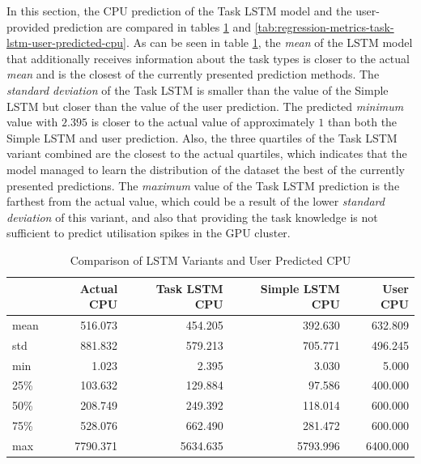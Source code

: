       In this section, the CPU prediction of the Task LSTM model and the user-provided prediction are compared in tables \ref{tab:comparison-task-lstm-user-predicted-cpu} and \ref{tab:regression-metrics-task-lstm-user-predicted-cpu}.
      As can be seen in table \ref{tab:comparison-task-lstm-user-predicted-cpu}, the \emph{mean} of the LSTM model that additionally receives information about the task types is closer to the actual \emph{mean} and is the closest of the currently presented prediction methods. The \emph{standard deviation} of the Task LSTM is smaller than the value of the Simple LSTM but closer than the value of the user prediction. The predicted \emph{minimum} value with $2.395$ is closer to the actual value of approximately $1$ than both the Simple LSTM and user prediction.
      Also, the three quartiles of the Task LSTM variant combined are the closest to the actual quartiles, which indicates that the model managed to learn the distribution of the dataset the best of the currently presented predictions.
      The \emph{maximum} value of the Task LSTM prediction is the farthest from the actual value, which could be a result of the lower \emph{standard deviation} of this variant, and also that providing the task knowledge is not sufficient to predict utilisation spikes in the GPU cluster.
      \begin{table}
        \centering
        \caption{Comparison of LSTM Variants and User Predicted CPU}
        \label{tab:comparison-task-lstm-user-predicted-cpu}
        \begin{tabular}{|l|rrrr|}
          \toprule
          {} &  Actual CPU &  Task LSTM CPU &  Simple LSTM CPU &  User CPU \\
          \midrule
          mean &     516.073 &        454.205 &          392.630 &      632.809 \\
          std  &     881.832 &        579.213 &          705.771 &      496.245 \\
          min  &       1.023 &          2.395 &            3.030 &        5.000 \\
          25\%  &     103.632 &        129.884 &           97.586 &      400.000 \\
          50\%  &     208.749 &        249.392 &          118.014 &      600.000 \\
          75\%  &     528.076 &        662.490 &          281.472 &      600.000 \\
          max  &    7790.371 &       5634.635 &         5793.996 &     6400.000 \\
          \bottomrule
          \end{tabular}
      \end{table}
      
